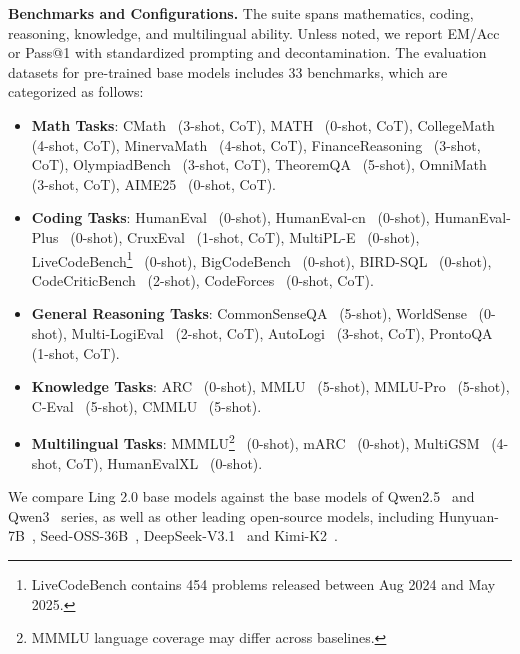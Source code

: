 {\bfseries Benchmarks and Configurations.} 
The suite spans mathematics, coding, reasoning, knowledge, and multilingual ability. Unless noted, we report EM/Acc or Pass@1 with standardized prompting and decontamination. The evaluation datasets for pre-trained base models includes 33 benchmarks, which are categorized as follows:
\begin{itemize}
    \item \textbf{Math Tasks}: CMath~\citep{cmath} (3-shot, CoT), 
    MATH~\citep{math} (0-shot, CoT), 
    CollegeMath~\citep{college-math} (4-shot, CoT), 
    MinervaMath~\citep{Minerva} (4-shot, CoT), 
    FinanceReasoning~\citep{finance-reasoning} (3-shot, CoT), 
    OlympiadBench~\citep{olympiadbench} (3-shot, CoT), 
    TheoremQA~\citep{theoremqa} (5-shot), 
    OmniMath~\citep{omni-math} (3-shot, CoT), 
    AIME25~\citep{aime25} (0-shot, CoT).

    \item \textbf{Coding Tasks}: HumanEval~\citep{humaneval} (0-shot), 
    HumanEval-cn~\citep{humaneval_cn} (0-shot), 
    HumanEval-Plus~\citep{mbpp+} (0-shot), 
    CruxEval~\citep{cruxeval} (1-shot, CoT), 
    MultiPL-E~\citep{multipl-e} (0-shot), 
    LiveCodeBench\footnote{LiveCodeBench contains 454 problems released between Aug 2024 and May 2025. }~\citep{livecodebench} (0-shot), 
    BigCodeBench~\citep{bigcodebench} (0-shot), 
    BIRD-SQL~\citep{birdsql} (0-shot), 
    CodeCriticBench~\citep{codecriticbench} (2-shot), 
    CodeForces~\citep{codeforces} (0-shot, CoT).

    \item \textbf{General Reasoning Tasks}: 
    CommonSenseQA~\citep{talmor2018commonsenseqa} (5-shot), 
    WorldSense~\citep{worldsense} (0-shot), 
    Multi-LogiEval~\citep{Multilogieval} (2-shot, CoT), 
    AutoLogi~\citep{autologi} (3-shot, CoT), 
    ProntoQA~\citep{PrOntoQA} (1-shot, CoT). 

    \item \textbf{Knowledge Tasks}: ARC~\citep{arc} (0-shot), 
    MMLU~\citep{mmlu} (5-shot), 
    MMLU-Pro~\citep{mmlu-pro} (5-shot), 
    C-Eval~\citep{ceval} (5-shot), 
    CMMLU~\citep{cmmlu} (5-shot).

    \item \textbf{Multilingual Tasks}: 
    MMMLU\footnote{MMMLU language coverage may differ across baselines.}~\citep{mmmlu} (0-shot), 
    mARC~\citep{marc} (0-shot), 
    MultiGSM~\citep{mgsm} (4-shot, CoT), 
    HumanEvalXL~\citep{humanevalxl} (0-shot).
\end{itemize}
We compare Ling 2.0 base models against the base models of Qwen2.5~\citep{qwen2.5} and Qwen3~\citep{qwen3} series, as well as other leading open-source models, including Hunyuan-7B~\citep{hunyuan-7b}, Seed-OSS-36B~\citep{seed2025seed-oss}, DeepSeek-V3.1~\citep{deepseekai2024deepseekv3technicalreport} and Kimi-K2~\citep{kimiK2}.

